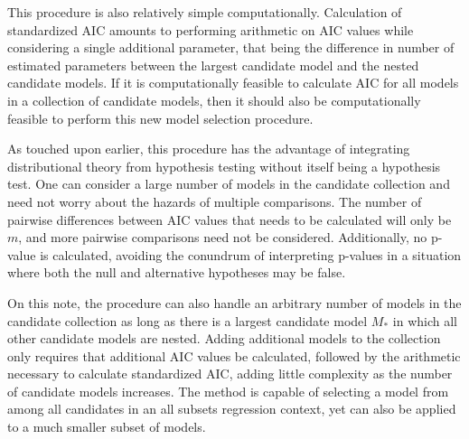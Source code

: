 		This procedure is also relatively simple computationally. Calculation of standardized AIC amounts to performing arithmetic on AIC values while considering
		a single additional parameter, that being the difference in number of estimated parameters between the largest candidate model and the nested candidate 
		models. If it is computationally feasible to calculate AIC for all models in a collection of candidate models, then it should also be computationally
		feasible to perform this new model selection procedure.
		
		As touched upon earlier, this procedure has the advantage of integrating distributional theory from hypothesis testing without itself being a hypothesis test.
		One can consider a large number of models in the candidate collection and need not worry about the hazards of multiple comparisons. The number of pairwise differences
		between AIC values that needs to be calculated will only be $m$, and more pairwise comparisons need not be considered. Additionally, no p-value
		is calculated, avoiding the conundrum of interpreting p-values in a situation where both the null and alternative hypotheses may be false.

		On this note, the procedure can also handle an arbitrary number of models in the candidate collection as long as there is a largest candidate model $M_*$ in which all
		other candidate models are nested. Adding additional models to the collection only requires that additional AIC values be calculated, followed by the arithmetic necessary to
		calculate standardized AIC, adding little complexity as the number of candidate models increases. The method is capable of selecting a model from among all
		candidates in an all subsets regression context, yet can also be applied to a much smaller subset of models.

